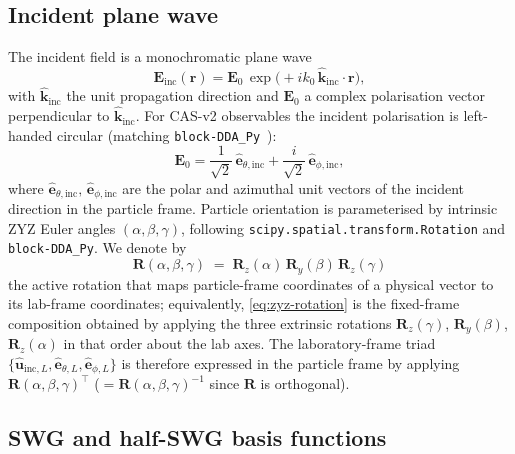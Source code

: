 \documentclass[11pt,a4paper]{article}
\begin{document}
\subsection{Incident plane wave}
\label{sec:incident-wave}

The incident field is a monochromatic plane wave
\begin{equation}
  \bm{E}_{\text{inc}}(\bm{r})
    = \bm{E}_0\,\exp\!\bigl(+i k_0\,\hat{\bm{k}}_{\text{inc}}\cdot\bm{r}\bigr),
  \label{eq:incident-wave}
\end{equation}
with $\hat{\bm{k}}_{\text{inc}}$ the unit propagation direction and
$\bm{E}_0$ a complex polarisation vector perpendicular to
$\hat{\bm{k}}_{\text{inc}}$. For CAS-v2 observables the incident
polarisation is left-handed circular (matching
\texttt{block-DDA\_Py}~\cite{Moteki2024}):
\begin{equation}
  \bm{E}_0
    = \frac{1}{\sqrt{2}}\,\hat{\bm{e}}_{\theta,\text{inc}}
      + \frac{i}{\sqrt{2}}\,\hat{\bm{e}}_{\phi,\text{inc}},
  \label{eq:circular-pol}
\end{equation}
where $\hat{\bm{e}}_{\theta,\text{inc}},\,\hat{\bm{e}}_{\phi,\text{inc}}$
are the polar and azimuthal unit vectors of the incident direction in
the particle frame. Particle orientation is parameterised by intrinsic
ZYZ Euler angles $(\alpha,\beta,\gamma)$, following
\texttt{scipy.spatial.transform.Rotation} and \texttt{block-DDA\_Py}.
We denote by
\begin{equation}
  \mathbf{R}(\alpha,\beta,\gamma)
  \;=\; \mathbf{R}_z(\alpha)\,\mathbf{R}_y(\beta)\,\mathbf{R}_z(\gamma)
  \label{eq:zyz-rotation}
\end{equation}
the active rotation that maps particle-frame coordinates of a physical
vector to its lab-frame coordinates; equivalently,
\eqref{eq:zyz-rotation} is the fixed-frame composition obtained by
applying the three extrinsic rotations
$\mathbf{R}_z(\gamma)$, $\mathbf{R}_y(\beta)$, $\mathbf{R}_z(\alpha)$
in that order about the lab axes. The laboratory-frame triad
$\{\hat{\bm{u}}_{\text{inc},L},\hat{\bm{e}}_{\theta,L},\hat{\bm{e}}_{\phi,L}\}$
is therefore expressed in the particle frame by applying
$\mathbf{R}(\alpha,\beta,\gamma)^{\top}$
($=\mathbf{R}(\alpha,\beta,\gamma)^{-1}$ since $\mathbf{R}$ is
orthogonal).

\subsection{SWG and half-SWG basis functions}
\label{sec:swg}
\end{document}
